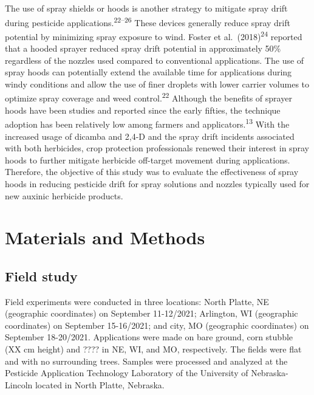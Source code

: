 \documentclass[
  12pt,
  a4paper,
]{article}
\begin{document}
The use of spray shields or hoods is another strategy to mitigate spray
drift during pesticide applications.\textsuperscript{22--26} These
devices generally reduce spray drift potential by minimizing spray
exposure to wind. Foster et al.~(2018)\textsuperscript{24} reported that
a hooded sprayer reduced spray drift potential in approximately 50\%
regardless of the nozzles used compared to conventional applications.
The use of spray hoods can potentially extend the available time for
applications during windy conditions and allow the use of finer droplets
with lower carrier volumes to optimize spray coverage and weed
control.\textsuperscript{22} Although the benefits of sprayer hoods have
been studies and reported since the early fifties, the technique
adoption has been relatively low among farmers and
applicators.\textsuperscript{13} With the increased usage of dicamba and
2,4-D and the spray drift incidents associated with both herbicides,
crop protection professionals renewed their interest in spray hoods to
further mitigate herbicide off-target movement during applications.
Therefore, the objective of this study was to evaluate the effectiveness
of spray hoods in reducing pesticide drift for spray solutions and
nozzles typically used for new auxinic herbicide products.

\hypertarget{materials-and-methods}{%
\section{Materials and Methods}\label{materials-and-methods}}

\hypertarget{field-study}{%
\subsection{Field study}\label{field-study}}

Field experiments were conducted in three locations: North Platte, NE
(geographic coordinates) on September 11-12/2021; Arlington, WI
(geographic coordinates) on September 15-16/2021; and city, MO
(geographic coordinates) on September 18-20/2021. Applications were made
on bare ground, corn stubble (XX cm height) and ???? in NE, WI, and MO,
respectively. The fields were flat and with no surrounding trees.
Samples were processed and analyzed at the Pesticide Application
Technology Laboratory of the University of Nebraska-Lincoln located in
North Platte, Nebraska.
\end{document}
